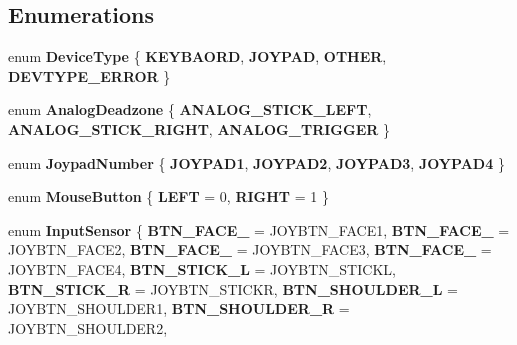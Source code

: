 \subsection*{Enumerations}
\begin{DoxyCompactItemize}
\item 
\mbox{\label{namespace_blade_a4b2643b070de59e7efb19f822b58c3e2}} 
enum {\bfseries Device\+Type} \{ {\bfseries K\+E\+Y\+B\+A\+O\+RD}, 
{\bfseries J\+O\+Y\+P\+AD}, 
{\bfseries O\+T\+H\+ER}, 
{\bfseries D\+E\+V\+T\+Y\+P\+E\+\_\+\+E\+R\+R\+OR}
 \}
\item 
\mbox{\label{namespace_blade_adb8d53ba532ddbcaa1145cd0e90ea044}} 
enum {\bfseries Analog\+Deadzone} \{ {\bfseries A\+N\+A\+L\+O\+G\+\_\+\+S\+T\+I\+C\+K\+\_\+\+L\+E\+FT}, 
{\bfseries A\+N\+A\+L\+O\+G\+\_\+\+S\+T\+I\+C\+K\+\_\+\+R\+I\+G\+HT}, 
{\bfseries A\+N\+A\+L\+O\+G\+\_\+\+T\+R\+I\+G\+G\+ER}
 \}
\item 
\mbox{\label{namespace_blade_a753f8267ca1993620f0dc38c4337129c}} 
enum {\bfseries Joypad\+Number} \{ {\bfseries J\+O\+Y\+P\+A\+D1}, 
{\bfseries J\+O\+Y\+P\+A\+D2}, 
{\bfseries J\+O\+Y\+P\+A\+D3}, 
{\bfseries J\+O\+Y\+P\+A\+D4}
 \}
\item 
\mbox{\label{namespace_blade_abae6e4a03fc5f7056462625f0af3856c}} 
enum {\bfseries Mouse\+Button} \{ {\bfseries L\+E\+FT} = 0, 
{\bfseries R\+I\+G\+HT} = 1
 \}
\item 
\mbox{\label{namespace_blade_a1ecca198b7e0afbe43139ec2b0db937c}} 
enum {\bfseries Input\+Sensor} \{ \newline
{\bfseries B\+T\+N\+\_\+\+F\+A\+C\+E\+\_} = J\+O\+Y\+B\+T\+N\+\_\+\+F\+A\+C\+E1, 
{\bfseries B\+T\+N\+\_\+\+F\+A\+C\+E\+\_} = J\+O\+Y\+B\+T\+N\+\_\+\+F\+A\+C\+E2, 
{\bfseries B\+T\+N\+\_\+\+F\+A\+C\+E\+\_} = J\+O\+Y\+B\+T\+N\+\_\+\+F\+A\+C\+E3, 
{\bfseries B\+T\+N\+\_\+\+F\+A\+C\+E\+\_} = J\+O\+Y\+B\+T\+N\+\_\+\+F\+A\+C\+E4, 
\newline
{\bfseries B\+T\+N\+\_\+\+S\+T\+I\+C\+K\+\_\+L} = J\+O\+Y\+B\+T\+N\+\_\+\+S\+T\+I\+C\+KL, 
{\bfseries B\+T\+N\+\_\+\+S\+T\+I\+C\+K\+\_\+R} = J\+O\+Y\+B\+T\+N\+\_\+\+S\+T\+I\+C\+KR, 
{\bfseries B\+T\+N\+\_\+\+S\+H\+O\+U\+L\+D\+E\+R\+\_\+L} = J\+O\+Y\+B\+T\+N\+\_\+\+S\+H\+O\+U\+L\+D\+E\+R1, 
{\bfseries B\+T\+N\+\_\+\+S\+H\+O\+U\+L\+D\+E\+R\+\_\+R} = J\+O\+Y\+B\+T\+N\+\_\+\+S\+H\+O\+U\+L\+D\+E\+R2, 

\end{DoxyCompactItemize}
